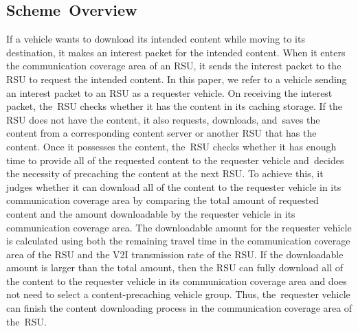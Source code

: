 \documentclass[sensors,aricle,accept,pdftex,moreauthors]{Definitions/mdpi}
\begin{document}
\subsection{Scheme~Overview}
If a vehicle wants to download its intended content while moving to its destination, it makes an interest packet for the intended content.
When it enters the communication coverage area of an RSU, it sends the interest packet to the RSU to request the intended content. 
In this paper, we refer to a vehicle sending an interest packet to an RSU as a requester vehicle.
On receiving the interest packet, the~RSU checks whether it has the content in its caching storage.
If the RSU does not have the content, it also requests, downloads, and~saves the content from a corresponding content server or another RSU that has the content.
Once it possesses the content, the~RSU checks whether it has enough time to provide all of the requested content to the requester vehicle and~decides the necessity of precaching the content at the next RSU.
To achieve this, it judges whether it can download all of the content to the requester vehicle in its communication coverage area by comparing the total amount of requested content and the amount downloadable by the requester vehicle in its communication coverage area.
The downloadable amount for the requester vehicle is calculated using both the remaining travel time in the communication coverage area of the RSU and the V2I transmission rate of the RSU.
If the downloadable amount is larger than the total amount, then the RSU can fully download all of the content to the requester vehicle in its communication coverage area and does not need to select a content-precaching vehicle group.
Thus, the~requester vehicle can finish the content downloading process in the communication coverage area of the~RSU.
\end{document}
